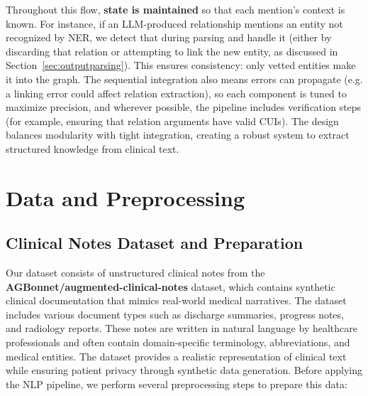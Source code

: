 Throughout this flow, \textbf{state is maintained} so that each mention's context is known. For instance, if an LLM-produced relationship mentions an entity not recognized by NER, we detect that during parsing and handle it (either by discarding that relation or attempting to link the new entity, as discussed in Section~\ref{sec:outputparsing}). This ensures consistency: only vetted entities make it into the graph. The sequential integration also means errors can propagate (e.g. a linking error could affect relation extraction), so each component is tuned to maximize precision, and wherever possible, the pipeline includes verification steps (for example, ensuring that relation arguments have valid CUIs). The design balances modularity with tight integration, creating a robust system to extract structured knowledge from clinical text.

\section{Data and Preprocessing}
\label{sec:datapreprocessing}

\subsection{Clinical Notes Dataset and Preparation}

Our dataset consists of unstructured clinical notes from the \textbf{AGBonnet/augmented-clinical-notes} dataset, which contains synthetic clinical documentation that mimics real-world medical narratives. The dataset includes various document types such as discharge summaries, progress notes, and radiology reports. These notes are written in natural language by healthcare professionals and often contain domain-specific terminology, abbreviations, and medical entities. The dataset provides a realistic representation of clinical text while ensuring patient privacy through synthetic data generation. Before applying the NLP pipeline, we perform several preprocessing steps to prepare this data:

